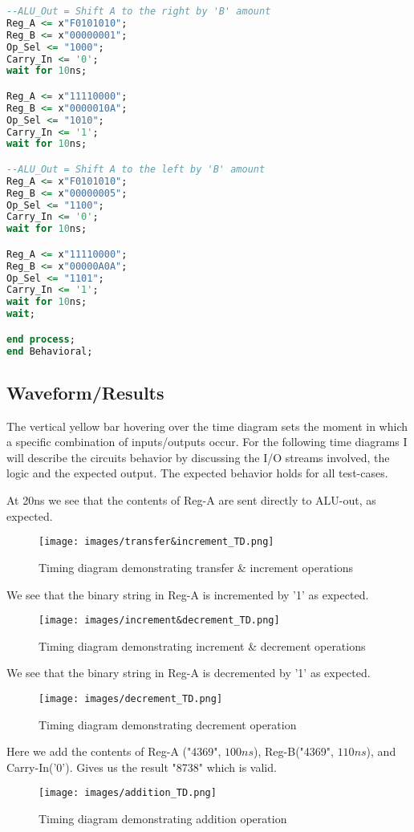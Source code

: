 \documentclass[notitlepage,a4paper,oneside,article,table]{article}
\begin{document}
\begin{lstlisting}[language=VHDL, caption=IC test-bench scr code]
--ALU_Out = Shift A to the right by 'B' amount
Reg_A <= x"F0101010";
Reg_B <= x"00000001";
Op_Sel <= "1000";
Carry_In <= '0';
wait for 10ns;

Reg_A <= x"11110000";
Reg_B <= x"0000010A";
Op_Sel <= "1010";
Carry_In <= '1';
wait for 10ns;

--ALU_Out = Shift A to the left by 'B' amount
Reg_A <= x"F0101010";
Reg_B <= x"00000005";
Op_Sel <= "1100";
Carry_In <= '0';
wait for 10ns;

Reg_A <= x"11110000";
Reg_B <= x"00000A0A";
Op_Sel <= "1101";
Carry_In <= '1';
wait for 10ns;
wait;

end process;
end Behavioral;
\end{lstlisting}


\subsection{Waveform/Results}
The vertical yellow bar hovering over the time diagram sets the moment in which a specific combination of inputs/outputs occur. For the following time diagrams I will describe the circuits behavior by discussing the I/O streams involved, the logic and the expected output. The expected behavior holds for all test-cases.
\vspace{0.5cm}



At 20ns we see that the contents of Reg-A are sent directly to ALU-out, as expected.

\begin{figure}[h] %
    \centering
    \texttt{[image: images/transfer\&increment\_TD.png]}
    \caption{Timing diagram demonstrating transfer \& increment operations}
\end{figure}
\FloatBarrier
We see that the binary string in Reg-A is incremented by '1' as expected.
\begin{figure}[h] %
    \centering
    \texttt{[image: images/increment\&decrement\_TD.png]}
    \caption{Timing diagram demonstrating increment \& decrement operations}
\end{figure}
\FloatBarrier
We see that the binary string in Reg-A is decremented by '1' as expected.
\begin{figure}[h] %
    \centering
    \texttt{[image: images/decrement\_TD.png]}
    \caption{Timing diagram demonstrating decrement operation}
\end{figure}
\FloatBarrier
Here we add the contents of Reg-A ("4369", $100ns$), Reg-B("4369", $110ns$), and Carry-In('0'). Gives us the result "8738" which is valid.
\begin{figure}[h] %
    \centering
    \texttt{[image: images/addition\_TD.png]}
    \caption{Timing diagram demonstrating addition operation}
\end{figure}
\FloatBarrier
\end{document}
